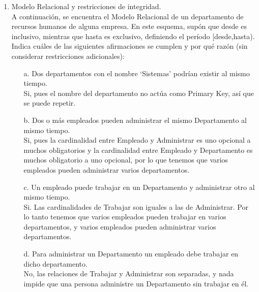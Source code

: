 \documentclass[12pt,a4paper]{article}
\begin{document}
\begin{enumerate}
	\item Modelo Relacional y restricciones de integridad.\\

		A continuación, se encuentra el Modelo Relacional de un departamento de recursos humanos de alguna empresa.
		En este esquema, supón que desde es inclusivo, mientras que hasta es exclusivo,
		definiendo el período [desde,hasta).
		Indica cuáles de las siguientes afirmaciones se cumplen y por qué razón
		(sin considerar restricciones adicionales):

		\begin{enumerate}
            \item[a.] Dos departamentos con el nombre ‘Sistemas’ podrían existir al mismo tiempo.\\
            
            Si, pues el nombre del departamento no actúa como Primary Key, así que se puede repetir.\\
            
            \item[b.] Dos o más empleados pueden administrar el mismo Departamento al mismo tiempo.\\
            
            Si, pues la cardinalidad entre Empleado y Administrar es uno opcional a muchos obligatorios y la cardinalidad entre Empleado y Departamento es muchos obligatorio a uno opcional, por lo que tenemos que varios empleados pueden administrar varios departamentos. \\
            
            \item[c.] Un empleado puede trabajar en un Departamento y administrar otro al mismo tiempo.\\
            
            Si. Las cardinalidades de Trabajar son iguales a las de Administrar. Por lo tanto tenemos que varios empleados pueden trabajar en varios departamentos, y varios empleados pueden administrar varios departamentos. \\
            
            \item[d.] Para administrar un Departamento un empleado debe trabajar en dicho departamento.\\
            
            No, las relaciones de Trabajar y Administrar son separadas, y nada impide que una persona administre un Departamento sin trabajar en él. \\
            

\end{enumerate}
\end{enumerate}
\end{document}
